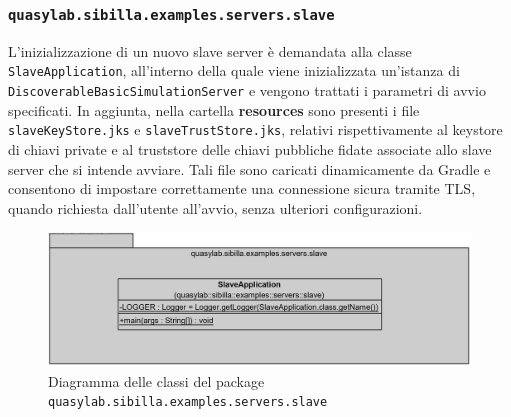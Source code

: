 \subsubsection{\texttt{quasylab.sibilla.examples.servers.slave}}

L'inizializzazione di un nuovo slave server è demandata alla classe \texttt{SlaveApplication}, all'interno della quale viene inizializzata un'istanza di \texttt{DiscoverableBasicSimulationServer} e vengono trattati i parametri di avvio specificati.
In aggiunta, nella cartella \textbf{resources} sono presenti i file \texttt{slaveKeyStore.jks} e \texttt{slaveTrustStore.jks}, relativi rispettivamente al keystore di chiavi private e al truststore delle chiavi pubbliche fidate associate allo slave server che si intende avviare. Tali file sono caricati dinamicamente da Gradle e consentono di impostare correttamente una connessione sicura tramite TLS, quando richiesta dall'utente all'avvio, senza ulteriori configurazioni.

\begin{figure}[H]
    \includegraphics[width=\linewidth]{images/quasylab.sibilla.examples.servers.slave.png}
    \captionsetup{justification=centering}
    \caption{Diagramma delle classi del package \texttt{quasylab.sibilla.examples.servers.slave}}
  \end{figure}

